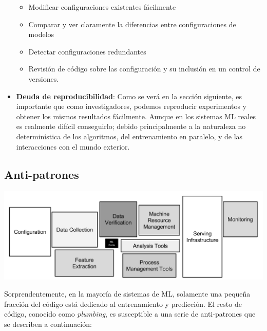 \documentclass[
  12pt,
  a4paperpaper,
]{report}
\providecommand{\tightlist}{%
  \setlength{\itemsep}{0pt}\setlength{\parskip}{0pt}}
\begin{document}
\begin{itemize}
  \begin{itemize}
  \tightlist
  \item
    Modificar configuraciones existentes fácilmente
  \item
    Comparar y ver claramente la diferencias entre configuraciones de
    modelos
  \item
    Detectar configuraciones redundantes
  \item
    Revisión de código sobre las configuración y su inclusión en un
    control de versiones.
  \end{itemize}
\item
  \textbf{Deuda de reproducibilidad}: Como se verá en la sección
  siguiente, es importante que como investigadores, podemos reproducir
  experimentos y obtener los mismos resultados fácilmente. Aunque en los
  sistemas ML reales es realmente difícil conseguirlo; debido
  principalmente a la naturaleza no determinística de los algoritmos,
  del entrenamiento en paralelo, y de las interacciones con el mundo
  exterior.
\end{itemize}

\hypertarget{anti-patrones}{%
\subsection{Anti-patrones}\label{anti-patrones}}

\includegraphics{source/figures/technical_debt.png}

Sorprendentemente, en la mayoría de sistemas de ML, solamente una
pequeña fracción del código está dedicado al entrenamiento y predicción.
El resto de código, conocido como \emph{plumbing}, es susceptible a una
serie de anti-patrones que se describen a continuación:
\end{document}
